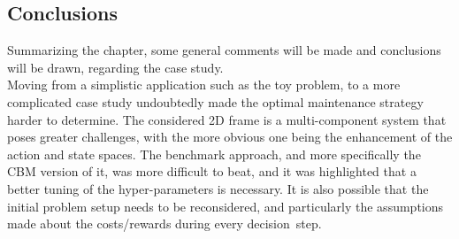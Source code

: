 
\subsection{Conclusions}

Summarizing the chapter, some general comments will be made and conclusions will be drawn, regarding the case study.\\

Moving from a simplistic application such as the toy problem, to a more complicated case study undoubtedly made the optimal maintenance strategy harder to determine. The considered 2D frame is a multi-component system that poses greater challenges, with the more obvious one being the enhancement of the action and state spaces. The benchmark approach, and more specifically the \gls{CBM} version of it, was more difficult to beat, and it was highlighted that a better tuning of the hyper-parameters is necessary. It is also possible that the initial problem setup needs to be reconsidered, and particularly the assumptions made about the costs/rewards during every decision~step.